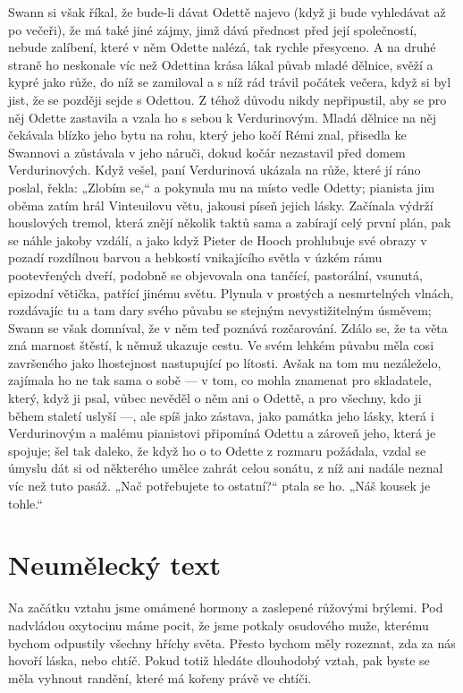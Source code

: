 \documentclass[13pt, a4paper, twoside]{article}
\begin{document}
\onehalfspacing \large
Swann si však říkal, že bude-li dávat Odettě najevo (když ji bude
vyhledávat až po večeři), že má také jiné zájmy, jimž dává přednost před
její společností, nebude zalíbení, které v něm Odette nalézá, tak rychle
přesyceno. A na druhé straně ho neskonale víc než Odettina krása lákal
půvab mladé dělnice, svěží a kypré jako růže, do níž se zamiloval a s níž
rád trávil počátek večera, když si byl jist, že se později sejde s Odettou. Z
téhož důvodu nikdy nepřipustil, aby se pro něj Odette zastavila a vzala ho s
sebou k Verdurinovým. Mladá dělnice na něj čekávala blízko jeho bytu na
rohu, který jeho kočí Rémi znal, přisedla ke Swannovi a zůstávala v jeho
náruči, dokud kočár nezastavil před domem Verdurinových. Když vešel,
paní Verdurinová ukázala na růže, které jí ráno poslal, řekla: „Zlobím se,“ a
pokynula mu na místo vedle Odetty; pianista jim oběma zatím hrál
Vinteuilovu větu, jakousi píseň jejich lásky. Začínala výdrží houslových
tremol, která znějí několik taktů sama a zabírají celý první plán, pak se
náhle jakoby vzdálí, a jako když Pieter de Hooch prohlubuje své obrazy v
pozadí rozdílnou barvou a hebkostí vnikajícího světla v úzkém rámu
pootevřených dveří, podobně se objevovala ona tančící, pastorální, vsunutá,
epizodní větička, patřící jinému světu. Plynula v prostých a nesmrtelných
vlnách, rozdávajíc tu a tam dary svého půvabu se stejným nevystižitelným
úsměvem; Swann se však domníval, že v něm teď poznává rozčarování.
Zdálo se, že ta věta zná marnost štěstí, k němuž ukazuje cestu.
Ve svém
lehkém půvabu měla cosi završeného jako lhostejnost nastupující po lítosti.
Avšak na tom mu nezáleželo, zajímala ho ne tak sama o sobě — v tom, co
mohla znamenat pro skladatele, který, když ji psal, vůbec nevěděl o něm ani
o Odettě, a pro všechny, kdo ji během staletí uslyší —, ale spíš jako zástava,
jako památka jeho lásky, která i Verdurinovým a malému pianistovi
připomíná Odettu a zároveň jeho, která je spojuje; šel tak daleko, že když
ho o to Odette z rozmaru požádala, vzdal se úmyslu dát si od některého
umělce zahrát celou sonátu, z níž ani nadále neznal víc než tuto pasáž. „Nač
potřebujete to ostatní?“ ptala se ho. „Náš kousek je tohle.“

\noindent\makebox[\linewidth]{\rule{\paperwidth}{0.4pt}}

\section*{Neumělecký text}
Na začátku vztahu jsme omámené hormony a zaslepené růžovými brýlemi. Pod nadvládou oxytocinu máme pocit, že jsme potkaly osudového muže, kterému bychom odpustily všechny hříchy světa. Přesto bychom měly rozeznat, zda za nás hovoří láska, nebo chtíč. Pokud totiž hledáte dlouhodobý vztah, pak byste se měla vyhnout randění, které má kořeny právě ve chtíči.
\end{document}
